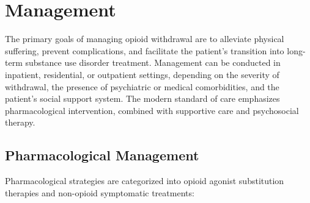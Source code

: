 \section*{Management}
The primary goals of managing opioid withdrawal are to alleviate physical suffering, prevent complications, and facilitate the patient's transition into long-term substance use disorder treatment. Management can be conducted in inpatient, residential, or outpatient settings, depending on the severity of withdrawal, the presence of psychiatric or medical comorbidities, and the patient's social support system. The modern standard of care emphasizes pharmacological intervention, combined with supportive care and psychosocial therapy.

\subsection*{Pharmacological Management}
Pharmacological strategies are categorized into opioid agonist substitution therapies and non-opioid symptomatic treatments:
